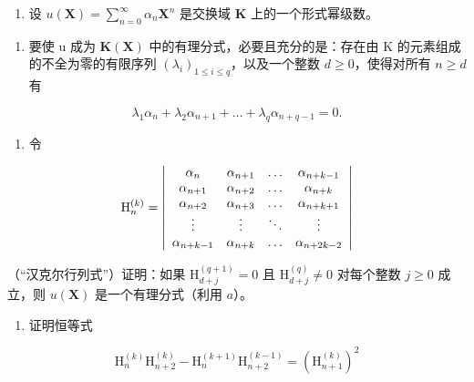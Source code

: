 \BourbakiExerciseGroup

\begin{enumerate}
\def\labelenumi{\arabic{enumi})}
\tightlist
\item
  设 \(u(\mathbf{X}) = \sum_{n=0}^{\infty} \alpha_n \mathbf{X}^n\) 是交换域 \(\mathbf{K}\) 上的一个形式幂级数。
\end{enumerate}

\begin{enumerate}
\def\labelenumi{\alph{enumi})}
\tightlist
\item
  要使 u 成为 \(\mathbf{K}(\mathbf{X})\) 中的有理分式，必要且充分的是：存在由 K 的元素组成的不全为零的有限序列 \((\lambda_{i})_{1\leq i\leq q}\)，以及一个整数 \(d\geq0\)，使得对所有 \(n\geq d\) 有
\end{enumerate}

\[
\lambda_ {1} \alpha_ {n} + \lambda_ {2} \alpha_ {n + 1} + \dots + \lambda_ {q} \alpha_ {n + q - 1} = 0.
\]

\begin{enumerate}
\def\labelenumi{\alph{enumi})}
\setcounter{enumi}{1}
\tightlist
\item
  令
\end{enumerate}

\[
\mathrm{H} _ {n} ^ {(k)} = \left| \begin{array}{c c c c} \alpha_ {n} & \alpha_ {n + 1} & \dots & \alpha_ {n + k - 1} \\ \alpha_ {n + 1} & \alpha_ {n + 2} & \dots & \alpha_ {n + k} \\ \alpha_ {n + 2} & \alpha_ {n + 3} & \dots & \alpha_ {n + k + 1} \\ \vdots & \vdots & \ddots & \vdots \\ \alpha_ {n + k - 1} & \alpha_ {n + k} & \dots & \alpha_ {n + 2 k - 2} \end{array} \right|
\]

（“汉克尔行列式”）证明：如果 \(\mathrm{H}_{d+j}^{(q+1)} = 0\) 且 \(\mathrm{H}_{d+j}^{(q)} \neq 0\) 对每个整数 \(j \geqslant 0\) 成立，则 \(u(\mathbf{X})\) 是一个有理分式（利用 \(a\)）。

\begin{enumerate}
\def\labelenumi{\alph{enumi})}
\setcounter{enumi}{2}
\tightlist
\item
  证明恒等式
\end{enumerate}

\[
\mathrm{H} _ {n} ^ {(k)} \mathrm{H} _ {n + 2} ^ {(k)} - \mathrm{H} _ {n} ^ {(k + 1)} \mathrm{H} _ {n + 2} ^ {(k - 1)} = (\mathrm{H} _ {n + 1} ^ {(k)}) ^ {2}
\]

